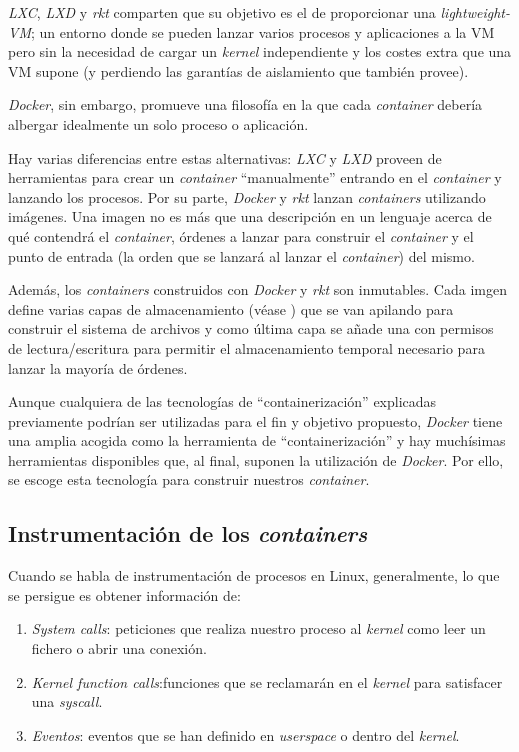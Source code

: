 \emph{LXC}, \emph{LXD} y \emph{rkt} comparten que su objetivo es el de proporcionar una \emph{lightweight-VM}; un entorno donde se pueden lanzar varios procesos y aplicaciones a la VM
pero sin la necesidad de cargar un \emph{kernel} independiente y los costes extra que una VM supone (y perdiendo las garantías de aislamiento que también provee).

\emph{Docker}, sin embargo, promueve una filosofía en la que cada \emph{container} debería albergar idealmente un solo proceso o aplicación.

Hay varias diferencias entre estas alternativas: \emph{LXC} y \emph{LXD} proveen de herramientas para crear un \emph{container} ``manualmente'' entrando en el \emph{container} y lanzando los procesos. Por su parte, \emph{Docker} y \emph{rkt}
lanzan \emph{containers} utilizando imágenes. Una imagen no es más que una descripción en un lenguaje acerca de qué contendrá el \emph{container}, órdenes a lanzar para construir el \emph{container} y el punto de entrada (la orden que se lanzará al lanzar el \emph{container}) del mismo.

Además, los \emph{containers} construidos con \emph{Docker} y \emph{rkt} son inmutables. Cada imgen define varias capas de almacenamiento (véase \cite{docker-storage}) que se van apilando
para construir el sistema de archivos y como última capa se añade una con permisos de lectura/escritura para permitir el almacenamiento temporal necesario para lanzar
la mayoría de órdenes.

Aunque cualquiera de las tecnologías de ``containerización'' explicadas previamente podrían ser utilizadas para el fin y objetivo propuesto, \emph{Docker} tiene una amplia acogida como la herramienta de ``containerización''
y hay muchísimas herramientas disponibles que, al final, suponen la utilización de \emph{Docker}. Por ello, se escoge esta tecnología para construir nuestros \emph{container}.

\subsection{Instrumentación de los \emph{containers}}
\label{subsec:instrumentacion-containers}

Cuando se habla de instrumentación de procesos en Linux, generalmente, lo que se persigue es obtener información de:
\begin{enumerate}
    \item \emph{System calls}: peticiones que realiza nuestro proceso al \emph{kernel} como leer un fichero o abrir una conexión.
    \item \emph{Kernel function calls}:funciones que se reclamarán en el \emph{kernel} para satisfacer una \emph{syscall}.
    \item \emph{Eventos}: eventos que se han definido en \emph{userspace} o dentro del \emph{kernel}.
\end{enumerate}

